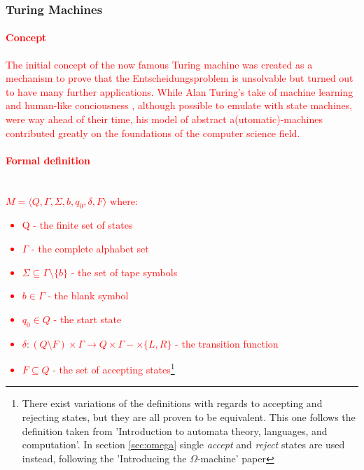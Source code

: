 \documentclass[12pt,a4,xcolor=table]{article}
\begin{document}
	\subsubsection{Turing Machines}
	\textcolor{red}{
	\paragraph{Concept}
	The initial concept of the now famous Turing machine was created as a mechanism to prove that the Entscheidungsproblem is unsolvable \cite{Turing1936} but turned out to have many further applications. While Alan Turing's take of machine learning \cite{Turing1969} %
	and human-like conciousness \cite{Turing1950}, although possible to emulate with state machines, were way ahead of their time, his model of abstract a(utomatic)-machines contributed greatly on the foundations of the computer science field.
	\paragraph{Formal definition}\hfill\\
	$M=\langle Q,\Gamma ,\Sigma,b,q_{0} ,\delta ,F\rangle$
	\cite{Hopcroft1979} where:
	\begin{multicols}{2}
		\begin{itemize}
			\item Q - the finite set of states
			\item $\Gamma$ - the complete alphabet set
			\item $\Sigma \subseteq \Gamma \setminus \{b\}$ - the set of tape symbols
			\item $b\in\Gamma$ - the blank symbol
			\item $q_{0}\in Q$ - the start state
			\item $\delta :(Q\setminus F)\times \Gamma \rightarrow Q\times \Gamma -  \times \{L,R\}$ - the transition function
			\item $F\subseteq Q$ - the set of accepting states\footnote{There exist variations of the definitions with regards to accepting and rejecting states, but they are all proven to be equivalent. This one follows the definition taken from 'Introduction to automata theory, languages, and computation'\cite{Hopcroft1979}. In section \ref{sec:omega} single \textit{accept} and \textit{reject} states are used instead, following the 'Introducing the $\Omega$-machine' paper\cite{Zhang2014}}
		\end{itemize}
	\end{multicols}
	}
\end{document}
